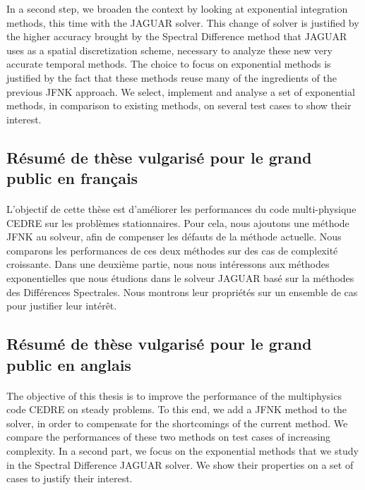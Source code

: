 In a second step, we broaden the context by looking at exponential integration methods, this time with the JAGUAR solver.
This change of solver is justified by the higher accuracy brought by the Spectral Difference method that JAGUAR uses as a spatial discretization scheme, necessary to analyze these new very accurate temporal methods.
The choice to focus on exponential methods is justified by the fact that these methods reuse many of the ingredients of the previous JFNK approach.
We select, implement and analyse a set of exponential methods, in comparison to existing methods, on several test cases to show their interest.


  \subsection{Résumé de thèse vulgarisé pour le grand public en français}

    \paragraph{}
L'objectif de cette thèse est d'améliorer les performances du code multi-physique CEDRE sur les problèmes stationnaires.
Pour cela, nous ajoutons une méthode JFNK au solveur, afin de compenser les défauts de la méthode actuelle.
Nous comparons les performances de ces deux méthodes sur des cas de complexité croissante.
Dans une deuxième partie, nous nous intéressons aux méthodes exponentielles que nous étudions dans le solveur JAGUAR basé sur la méthodes des Différences Spectrales.
Nous montrons leur propriétés sur un ensemble de cas pour justifier leur intérêt.


  \subsection{Résumé de thèse vulgarisé pour le grand public en anglais}

  \paragraph{}
The objective of this thesis is to improve the performance of the multiphysics code CEDRE on steady problems.
To this end, we add a JFNK method to the solver, in order to compensate for the shortcomings of the current method.
We compare the performances of these two methods on test cases of increasing complexity.
In a second part, we focus on the exponential methods that we study in the Spectral Difference JAGUAR solver.
We show their properties on a set of cases to justify their interest.
